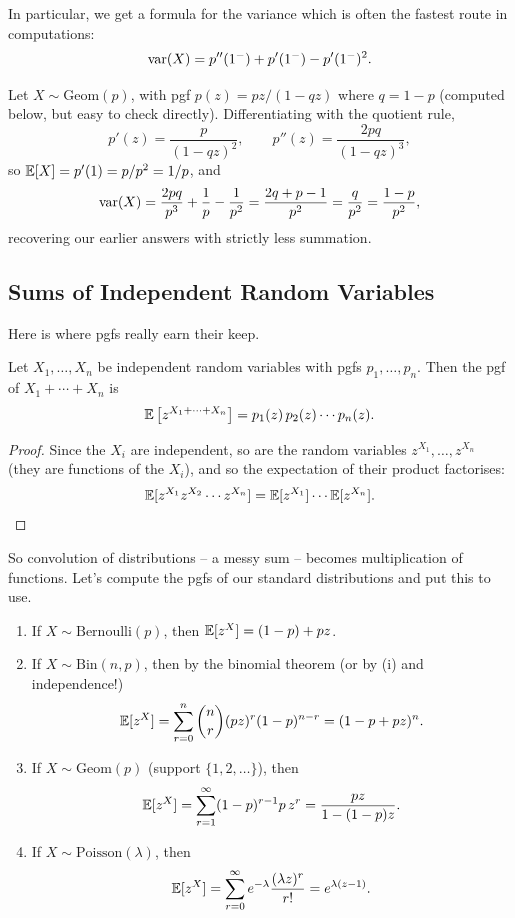 \documentclass[a4paper]{scrartcl}
\begin{document}
In particular, we get a formula for the variance which is often the fastest route in computations:
$$
\operatorname{var}(X) = p''(1^-) + p'(1^-) - p'(1^-)^2.
$$

\begin{example}
	Let $X \sim \mathrm{Geom}(p)$, with pgf $p(z) = pz/(1 - qz)$ where $q = 1 - p$ (computed below, but easy to check directly). Differentiating with the quotient rule,
	$$
	p'(z) = \frac{p}{(1 - qz)^2}, \qquad p''(z) = \frac{2pq}{(1 - qz)^3},
	$$
	so $\mathbb{E}[X] = p'(1) = p/p^2 = 1/p$, and
	$$
	\operatorname{var}(X) = \frac{2pq}{p^3} + \frac{1}{p} - \frac{1}{p^2} = \frac{2q + p - 1}{p^2} = \frac{q}{p^2} = \frac{1-p}{p^2},
	$$
	recovering our earlier answers with strictly less summation.
\end{example}

\subsection{Sums of Independent Random Variables}

Here is where pgfs really earn their keep.

\begin{theorem}
	Let $X_1, \dots, X_n$ be independent random variables with pgfs $p_1, \dots, p_n$. Then the pgf of $X_1 + \cdots + X_n$ is
	$$
	\mathbb{E}\left[z^{X_1 + \cdots + X_n}\right] = p_1(z)\, p_2(z) \cdots p_n(z).
	$$
\end{theorem}
\begin{proof}
	Since the $X_i$ are independent, so are the random variables $z^{X_1}, \dots, z^{X_n}$ (they are functions of the $X_i$), and so the expectation of their product factorises:
	$$
	\mathbb{E}[z^{X_1} z^{X_2} \cdots z^{X_n}] = \mathbb{E}[z^{X_1}]\cdots\mathbb{E}[z^{X_n}]. \qedhere
	$$
\end{proof}

So convolution of distributions -- a messy sum -- becomes multiplication of functions. Let's compute the pgfs of our standard distributions and put this to use.

\begin{example}
	\begin{enumerate}[label=(\roman*)]
		\item If $X \sim \mathrm{Bernoulli}(p)$, then $\mathbb{E}[z^X] = (1-p) + pz$.
		\item If $X \sim \mathrm{Bin}(n, p)$, then by the binomial theorem (or by (i) and independence!)
		$$
		\mathbb{E}[z^X] = \sum_{r=0}^{n}\binom{n}{r}(pz)^r (1-p)^{n - r} = (1 - p + pz)^n.
		$$
		\item If $X \sim \mathrm{Geom}(p)$ (support $\{1, 2, \dots\}$), then
		$$
		\mathbb{E}[z^X] = \sum_{r = 1}^{\infty} (1-p)^{r-1}p \, z^r = \frac{pz}{1 - (1-p)z}.
		$$
		\item If $X \sim \mathrm{Poisson}(\lambda)$, then
		$$
		\mathbb{E}[z^X] = \sum_{r = 0}^{\infty} e^{-\lambda}\frac{(\lambda z)^r}{r!} = e^{\lambda(z - 1)}.
		$$
	\end{enumerate}
\end{example}
\end{document}
